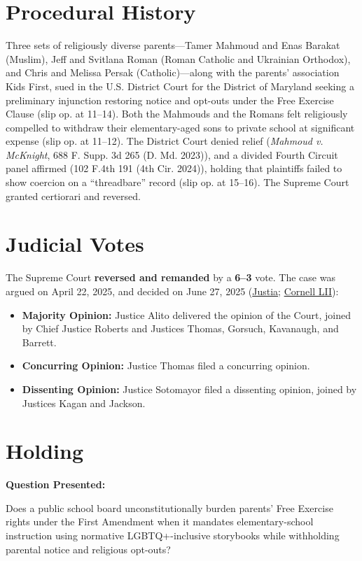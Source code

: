 \documentclass[12pt]{article}
\begin{document}
\section{Procedural History}
Three sets of religiously diverse parents---Tamer Mahmoud and Enas Barakat (Muslim), Jeff and Svitlana Roman (Roman Catholic and Ukrainian Orthodox), and Chris and Melissa Persak (Catholic)---along with the parents' association Kids First, sued in the U.S. District Court for the District of Maryland seeking a preliminary injunction restoring notice and opt-outs under the Free Exercise Clause (slip op. at 11--14). Both the Mahmouds and the Romans felt religiously compelled to withdraw their elementary-aged sons to private school at significant expense (slip op. at 11--12). The District Court denied relief (\textit{Mahmoud v. McKnight}, 688 F. Supp. 3d 265 (D. Md. 2023)), and a divided Fourth Circuit panel affirmed (102 F.4th 191 (4th Cir. 2024)), holding that plaintiffs failed to show coercion on a ``threadbare'' record (slip op. at 15--16). The Supreme Court granted certiorari and reversed.

\section{Judicial Votes}
The Supreme Court \textbf{reversed and remanded} by a \textbf{6--3} vote. The case was argued on April 22, 2025, and decided on June 27, 2025 (\href{https://supreme.justia.com/cases/federal/us/606/24-297/}{Justia}; \href{https://www.law.cornell.edu/supremecourt/text/24-297}{Cornell LII}):

\begin{itemize}
    \item \textbf{Majority Opinion:} Justice Alito delivered the opinion of the Court, joined by Chief Justice Roberts and Justices Thomas, Gorsuch, Kavanaugh, and Barrett.
    \item \textbf{Concurring Opinion:} Justice Thomas filed a concurring opinion.
    \item \textbf{Dissenting Opinion:} Justice Sotomayor filed a dissenting opinion, joined by Justices Kagan and Jackson.
\end{itemize}

\section{Holding}
\textbf{Question Presented:}

Does a public school board unconstitutionally burden parents' Free Exercise rights under the First Amendment when it mandates elementary-school instruction using normative LGBTQ+-inclusive storybooks while withholding parental notice and religious opt-outs?
\end{document}
